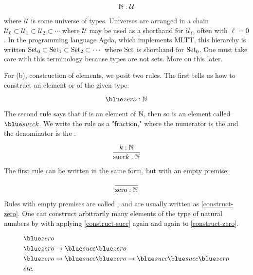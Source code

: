 \begin{equation}
\label{nat:intro}
\mathbb{N}: \mathcal{U}
\end{equation} 

where $\mathcal{U}$ is some universe of types.  Universes are arranged in a chain $\mathcal{U_0} \subset \mathcal{U_1} \subset \mathcal{U_2} \subset \cdots$ where $\mathcal{U}$ may be used as a shorthand for $\mathcal{U_\ell}$, often with $\ell = 0$.  In the programming language Agda, which implements MLTT, this hierarchy is written $\mathop{\text{Set}}_0 \subset \mathop{\text{Set}}_1 \subset \mathop{\text{Set}}_2 \subset \cdots$ where $\mathop{\text{Set}}$ is shorthand for $\mathop{\text{Set}}_0$.  One must take care with this terminology because types are not sets.  More on this later.

For (b), construction of elements, we posit two rules.  The first tells us how to construct an element or  of the given type:

\begin{equation}
\label{construct-zero}
\zero : \bbN
\end{equation} 

The second rule says that if  is an element of $\mathbb{N}$, then so is an element called $\suc k$.  We write the rule as a "fraction," where the numerator is the  and the denominator is the .

\begin{equation}
\label{construct-succ}
\frac{k: \mathbb{N}}{\text{succ}\space k : \mathbb{N}}
\end{equation}

The first rule can be written in the same form, but with an empty premise:

\begin{equation}
\label{construct-zero-b}
\frac{}{\text{zero}\space : \mathbb{N}}
\end{equation} 

Rules with empty premises are called , and are usually written as \eqref{construct-zero}.  One can construct arbitrarily many elements of the type of natural numbers by with applying \eqref{construct-succ} again and again to \eqref{construct-zero}.

\begin{align}
& \zero \\
& \zero \to \suc \zero \\
& \zero \to \suc \zero \to \suc \suc \zero \\
& etc.
\end{align}


